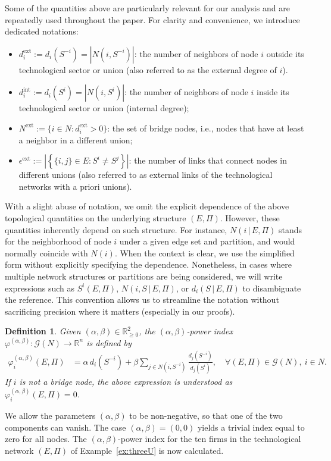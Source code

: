 \documentclass[preprint,11pt,authoryear]{elsarticle}
\theoremstyle{plain}
\newtheorem{definition}[theorem]{Definition}
\begin{document}
Some of the quantities above are particularly relevant for our analysis and are repeatedly used throughout the paper. For clarity and convenience, we introduce dedicated notations:

\begin{itemize}
\item[-]\( d_i^{\mathrm{ext}} := d_i(S^{-i}) = |N(i, S^{-i})| \): the number of neighbors of node \( i \) outside its technological sector or union (also referred to as the external degree of $i$).
    \item[-]\( d_i^{\mathrm{int}} := d_i(S^i) = |N(i, S^i)| \): the number of neighbors of node \( i \) inside its technological sector or union (internal degree);
    \item[-]\( N^{\mathrm{ext}} := \{ i \in N : d_i^{\mathrm{ext}} > 0 \} \): the set of bridge nodes, i.e., nodes that have at least a neighbor in a different union;
    \item[-]\( \epsilon^{\mathrm{ext}} := \left| \left\{ \{i,j\} \in E : S^i \neq S^j \right\} \right| \): the number of links that connect nodes in different unions (also referred to as external links of the technological networks with a priori unions).
\end{itemize}
 
With a slight abuse of notation, we omit the explicit dependence of the above topological quantities on the underlying structure \((E, \Pi)\). However, these quantities inherently depend on such structure. 
For instance, \(N(i\,|\,E,\Pi)\) stands for the neighborhood of node \(i\) under a given edge set and partition, and would normally coincide with \(N(i)\). When the context is clear, we use the simplified form without explicitly specifying the dependence. Nonetheless, in cases where multiple network structures or partitions are being considered, we will write expressions such as \(S^i(E,\Pi)\), \(N(i,S\,|\,E,\Pi)\), or \(d_i(S\,|\,E,\Pi)\) to disambiguate the reference.
This convention allows us to streamline the notation without sacrificing precision where it matters (especially in our proofs).
\begin{definition}
    Given $(\alpha,\beta)\in \mathbb{R}_{\geq 0}^2$, the \emph{$(\alpha,\beta)$-power index} $\varphi^{(\alpha,\beta)} : \mathcal{G}(N) \to \mathbb{R}^n$ is defined by
    \begin{align*}
        \varphi_i^{(\alpha,\beta)}(E,\Pi) & = \alpha\, d_i(S^{-i}) + \beta \sum_{j\in N(i,S^{-i})} \frac{d_j(S^{-i})}{d_j(S^{i})}, \quad \forall (E,\Pi)\in\mathcal{G}(N),\ i\in N.
    \end{align*}
    If $i$ is not a bridge node, the above expression is understood as $\varphi_i^{(\alpha,\beta)}(E,\Pi) = 0$.
    \end{definition}
We allow the parameters $(\alpha,\beta)$ to be non-negative, so that one of the two components can vanish. The case $(\alpha,\beta) = (0,0)$ yields a trivial index equal to zero for all nodes. The \((\alpha,\beta)\)-power index for the ten firms in the technological network \( (E, \Pi) \) of Example~\ref{ex:threeU} is now calculated.
 
\end{document}
